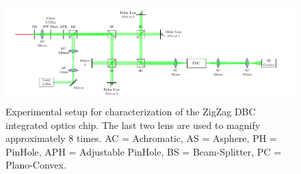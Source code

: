 \begin{figure}[htbp!]
 \centering
 \includegraphics[scale=.53]{../figures/montage.pdf}
 \caption{Experimental setup for characterization of the ZigZag DBC integrated optics chip. The last two lens are used to magnify approximately 8 times. AC = Achromatic, AS = Asphere, PH = PinHole, APH = Adjustable PinHole, BS = Beam-Splitter, PC = Plano-Convex.}
\end{figure}
 
